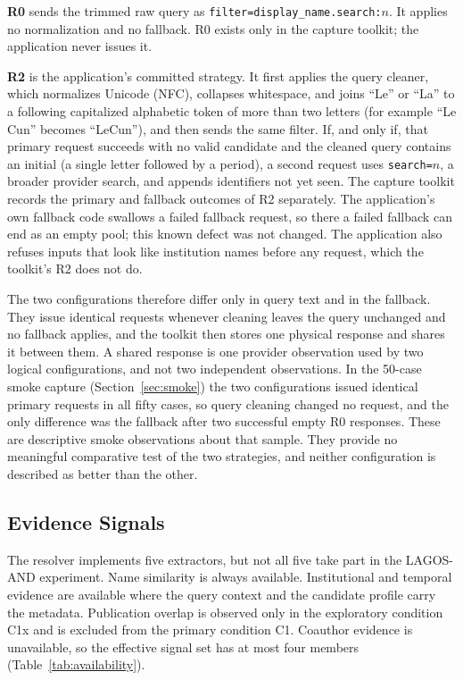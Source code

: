 \textbf{R0} sends the trimmed raw query as \texttt{filter=display\_name.search:}$n$. It applies no normalization and no fallback. R0 exists only in the capture toolkit; the application never issues it.

\textbf{R2} is the application's committed strategy. It first applies the query cleaner, which normalizes Unicode (NFC), collapses whitespace, and joins ``Le'' or ``La'' to a following capitalized alphabetic token of more than two letters (for example ``Le Cun'' becomes ``LeCun''), and then sends the same filter. If, and only if, that primary request succeeds with no valid candidate and the cleaned query contains an initial (a single letter followed by a period), a second request uses \texttt{search=}$n$, a broader provider search, and appends identifiers not yet seen. The capture toolkit records the primary and fallback outcomes of R2 separately. The application's own fallback code swallows a failed fallback request, so there a failed fallback can end as an empty pool; this known defect was not changed. The application also refuses inputs that look like institution names before any request, which the toolkit's R2 does not do.

The two configurations therefore differ only in query text and in the fallback. They issue identical requests whenever cleaning leaves the query unchanged and no fallback applies, and the toolkit then stores one physical response and shares it between them. A shared response is one provider observation used by two logical configurations, and not two independent observations. In the 50-case smoke capture (Section~\ref{sec:smoke}) the two configurations issued identical primary requests in all fifty cases, so query cleaning changed no request, and the only difference was the fallback after two successful empty R0 responses. These are descriptive smoke observations about that sample. They provide no meaningful comparative test of the two strategies, and neither configuration is described as better than the other.

\subsection{Evidence Signals}
\label{sec:signals}
The resolver implements five extractors, but not all five take part in the LAGOS-AND experiment. Name similarity is always available. Institutional and temporal evidence are available where the query context and the candidate profile carry the metadata. Publication overlap is observed only in the exploratory condition C1x and is excluded from the primary condition C1. Coauthor evidence is unavailable, so the effective signal set has at most four members (Table~\ref{tab:availability}).

